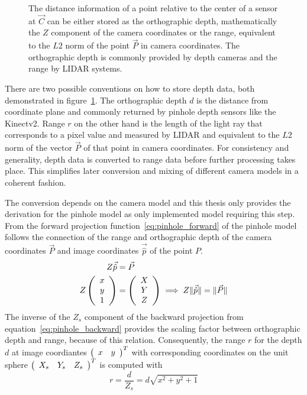 \begin{figure}[H]
    
    \caption[Orthographic Depth and Range visualized]{The distance information of a point relative to the center of a sensor at $\vec{C}$ can be either stored as the orthographic depth, mathematically the $Z$ component of the camera coordinates or the range, equivalent to the $L2$ norm of the point $\vec{P}$ in camera coordinates. The orthographic depth is commonly provided by depth cameras and the range by \acrshort{LIDAR} systems.}
    \label{fig:range_depth}
\end{figure}

There are two possible conventions on how to store depth data, both demonstrated in figure~\ref{fig:range_depth}.
The orthographic depth $d$ is the distance from coordinate plane and commonly returned by pinhole depth sensors like the Kinectv2.
Range $r$ on the other hand is the length of the light ray that corresponds to a pixel value and measured by \acrshort{LIDAR} and equivalent to the $L2$ norm of the vector $\vec{P}$ of that point in camera coordinates.
For consistency and generality, depth data is converted to range data before further processing takes place.
This simplifies later conversion and mixing of different camera models in a coherent fashion.

The conversion depends on the camera model and this thesis only provides the derivation for the pinhole model as only implemented model requiring this step.
From the forward projection function~\ref{eq:pinhole_forward} of the pinhole model follows the connection of the range and orthographic depth of the camera coordinates $\vec{P}$ and image coordinates $\vec{\hat{p}}$ of the point $P$.
\begin{equation}
\begin{aligned}
    Z \vec{\hat{p}} &= \vec{P} \\
    Z \left(\begin{array}{c} x \\ y \\ 1 \end{array}\right) &= \left(\begin{array}{c} X \\ Y \\ Z \end{array}\right)
    \implies
    Z \lVert\vec{\hat{p}}\rVert = \lVert\vec{P}\rVert
\end{aligned}
\end{equation}
The inverse of the $Z_{s}$ component of the backward projection from equation~\ref{eq:pinhole_backward} provides the scaling factor between orthographic depth and range, because of this relation.
Consequently, the range $r$ for the depth $d$ at image coordiantes $\left(\begin{array}{cc} x & y \end{array}\right)^T$ with corresponding coordinates on the unit sphere $\left(\begin{array}{ccc} X_s & Y_s & Z_s \end{array}\right)^T$ is computed with
\begin{equation}
    r = \frac{d}{Z_s} = d \sqrt{x^2 + y^2 + 1}
\end{equation}
